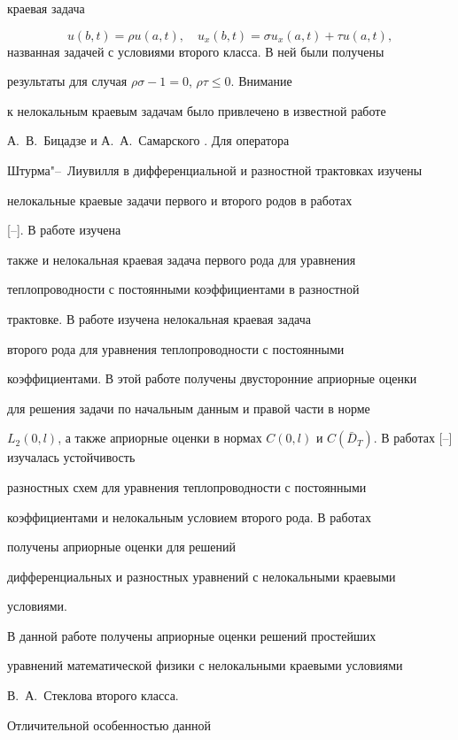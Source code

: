 краевая задача 

$$u(b,t)=\rho u(a,t), \quad  u_x(b,t)=\sigma u_x(a,t)+\tau

u(a,t),$$ названная задачей с условиями второго класса. В ней были получены

результаты для случая $ \rho\sigma-1=0$, $\rho\tau\leq 0$. Внимание

к нелокальным краевым задачам было привлечено в известной работе

А.~В.~Бицадзе и А.~А.~Самарского \cite{Bicadze}. Для оператора

Штурма"--~Лиувилля в дифференциальной и разностной трактовках изучены

нелокальные краевые задачи первого и второго родов в работах

[--]. В работе \cite{Shkhanukov} изучена

также  и нелокальная краевая задача первого рода для уравнения

теплопроводности с постоянными коэффициентами в разностной

трактовке. В работе \cite{Ionkin} изучена нелокальная краевая задача

второго рода для уравнения теплопроводности с постоянными

коэффициентами. В этой работе получены двусторонние априорные оценки

для решения задачи по начальным данным и правой части в норме

$L_2(0,l)$, а также априорные оценки в  нормах $C(0,l)$ и $C(\bar

D_T)$. В работах [--] изучалась устойчивость

разностных схем для уравнения теплопроводности с постоянными

коэффициентами и нелокальным условием второго рода. В работах

\cite{Al1, Al2} получены априорные оценки для решений

дифференциальных и разностных уравнений с нелокальными краевыми

условиями.



В данной работе получены априорные оценки решений простейших

уравнений математической физики с нелокальными краевыми условиями \linebreak

В.~А.~Стеклова второго класса. 

Отличительной особенностью данной

